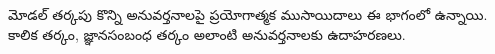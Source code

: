 \documentclass[../../include/open-logic-part]{subfiles}
\begin{document}

\begin{editorial}
మోడల్ తర్కపు కొన్ని అనువర్తనాలపై ప్రయోగాత్మక ముసాయిదాలు
ఈ భాగంలో ఉన్నాయి. కాలిక తర్కం, జ్ఞానసంబంధ తర్కం
అలాంటి అనువర్తనాలకు ఉదాహరణలు.
\end{editorial}



\OLEndPartHook
\end{document}
